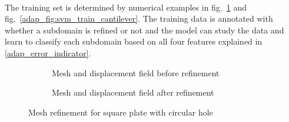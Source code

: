 \paragraph{}
The training set is determined by numerical examples in fig.~\ref{adap_fig:svm_train_chole} and fig.~\ref{adap_fig:svm_train_cantilever}.
The training data is annotated with whether a subdomain is refined or not and the model can study the data and learn to classify each subdomain based on all four features explained in \ref{adap_error_indicator}.
\begin{figure}[!ht]
    \centering
    \begin{subfigure}[b]{0.5\linewidth}
        \caption{Mesh and displacement field before refinement}
    \end{subfigure}
    \begin{subfigure}[b]{0.5\linewidth}
        \caption{Mesh and displacement field after refinement}
    \end{subfigure}
    \caption{Mesh refinement for square plate with circular hole \cite{Duval2018}}
    \label{adap_fig:svm_train_chole}
\end{figure}

